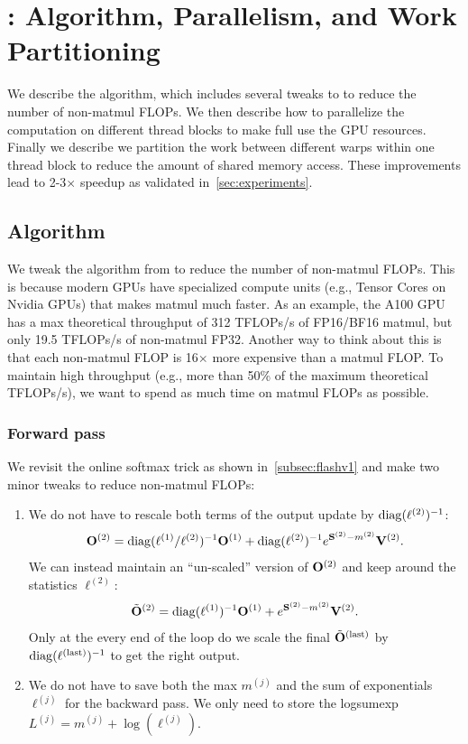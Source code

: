 \section{\sysname: Algorithm, Parallelism, and Work Partitioning}
\label{sec:algo}

We describe the \sysname algorithm, which includes several tweaks to \sysnameone
to reduce the number of non-matmul FLOPs.
We then describe how to parallelize the computation on different thread blocks
to make full use the GPU resources.
Finally we describe we partition the work between different warps within one
thread block to reduce the amount of shared memory access.
These improvements lead to 2-3$\times$ speedup as validated in~\cref{sec:experiments}.

\subsection{Algorithm}
\label{subsec:algo}

We tweak the algorithm from \sysnameone to reduce the number of non-matmul
FLOPs.
This is because modern GPUs have specialized compute units (e.g., Tensor Cores
on Nvidia GPUs) that makes matmul much faster.
As an example, the A100 GPU has a max theoretical throughput of 312 TFLOPs/s of
FP16/BF16 matmul, but only 19.5 TFLOPs/s of non-matmul FP32.
Another way to think about this is that each non-matmul FLOP is 16$\times$ more
expensive than a matmul FLOP.
To maintain high throughput (e.g., more than 50\% of the maximum theoretical
TFLOPs/s), we want to spend as much time on matmul FLOPs as possible.

\subsubsection{Forward pass}

We revisit the online softmax trick as shown in~\cref{subsec:flashv1} and make
two minor tweaks to reduce non-matmul FLOPs:
\begin{enumerate}
  \item We do not have to rescale both terms of the output update by $\mathrm{diag}(\ell^{(2)})^{-1}$:
  \begin{equation*}
    \mathbf{O}^{(2)} = \mathrm{diag}(\ell^{(1)} / \ell^{(2)})^{-1} \mathbf{O}^{(1)} + \mathrm{diag}(\ell^{(2)})^{-1} e^{\mathbf{S}^{(2)} - m^{(2)}} \mathbf{V}^{(2)}.
  \end{equation*}
  We can instead maintain an ``un-scaled'' version of $\mathbf{O}^{(2)}$ and keep
  around the statistics $\ell^{(2)}$:
  \begin{equation*}
    \tilde{\mathbf{O}}^{(2)} = \mathrm{diag}(\ell^{(1)})^{-1} \mathbf{O}^{(1)} + e^{\mathbf{S}^{(2)} - m^{(2)}} \mathbf{V}^{(2)}.
  \end{equation*}
  Only at the every end of the loop do we scale the final
  $\tilde{\mathbf{O}}^{(\mathrm{last})}$ by $\mathrm{diag}(\ell^{(\mathrm{last})})^{-1}$ to get
  the right output.

  \item We do not have to save both the max $m^{(j)}$ and the sum of
  exponentials $\ell^{(j)}$ for the backward pass. We only need to store the
  logsumexp $L^{(j)} = m^{(j)} + \log(\ell^{(j)})$.
\end{enumerate}

